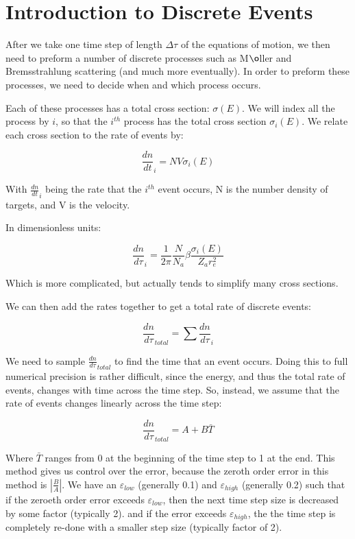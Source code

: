 \documentclass[]{article}
\begin{document}
\section{Introduction to Discrete Events}

After we take one time step of length $\Delta \tau$ of the equations of motion, we then need to preform a number of discrete processes such as M$\o$ller and Bremsstrahlung scattering (and much more eventually). In order to preform these processes, we need to decide when and which process occurs. 

Each of these processes has a total cross section: $\sigma(E)$. We will index all the process by $i$, so that the $i^{th}$ process has the total cross section $\sigma_i(E)$. We relate each cross section to the rate of events by:

\begin{equation}
\frac{dn}{dt}_i = N V \sigma_i(E)
\end{equation}

With $\frac{dn}{dt}_i$ being the rate that the $i^{th}$ event occurs, N is the number density of targets, and V is the velocity.

In dimensionless units:

\begin{equation} \label{eq:CS_rate}
\frac{dn}{d\tau}_{i} = \frac{1}{2 \pi} \frac{N}{N_a} \beta \frac{\sigma_i(E)}{Z_a r_e^2}
\end{equation}

Which is more complicated, but actually tends to simplify many cross sections.

We can then add the rates together to get a total rate of discrete events:

\begin{equation}
\frac{dn}{d\tau}_{total} = \sum \frac{dn}{d\tau}_{i}
\end{equation}

We need to sample $\frac{dn}{d\tau}_{total}$ to find the time that an event occurs. Doing this to full numerical precision is rather difficult, since the energy, and thus the total rate of events, changes with time across the time step. So, instead, we assume that the rate of events changes linearly across the time step:

\begin{equation}
\frac{dn}{d\tau}_{total} = A + B\bar{T}
\end{equation}

Where $\bar{T}$ ranges from 0 at the beginning of the time step to 1 at the end. This method gives us control over the error, because the zeroth order error in this method is $\left| \frac{B}{A} \right| $. We have an $ \varepsilon_{low}$ (generally 0.1) and $ \varepsilon_{high}$ (generally 0.2) such that if the zeroeth order error exceeds $ \varepsilon_{low}$, then the next time step size is decreased by some factor (typically 2). and if the error exceeds  $ \varepsilon_{high}$, the the time step is completely re-done with a smaller step size (typically factor of 2). 
\end{document}
